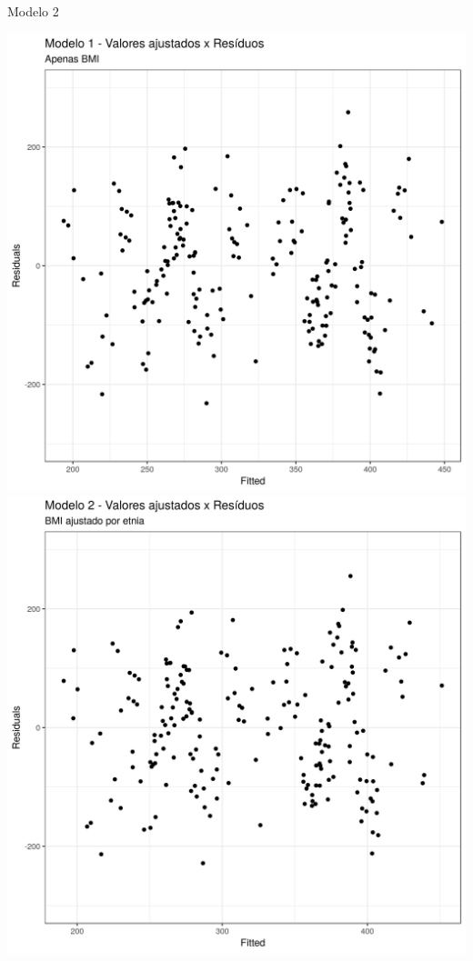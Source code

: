 \documentclass{beamer}
\begin{document}
\begin{frame}{\small Modelo 2}
  \begin{center}
    \includegraphics[height=.6\textheight]{Cap31-32/pratica-rlm1-resid}
    \includegraphics[height=.6\textheight]{Cap31-32/pratica-rlm2_0-resid}
  \end{center}
\end{frame}
\end{document}
